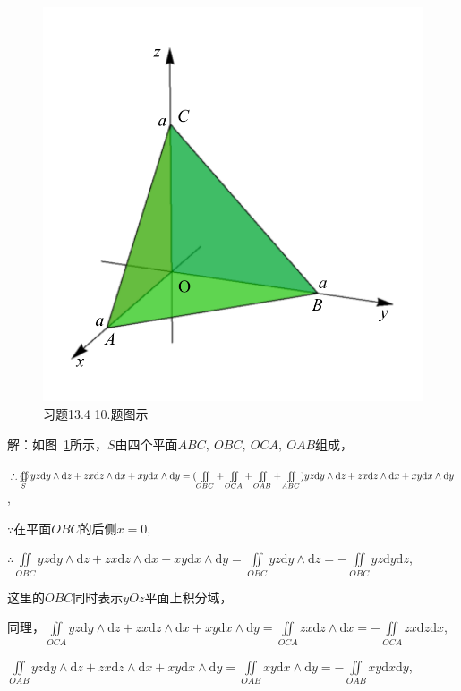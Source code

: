 \documentclass[12pt,UTF8,fleqn]{ctexart}
\newcommand{\md}[1]{\mathrm d#1}
\newcommand{\BSIInt}[2]{\iint\limits_{#1}#2}
\newcommand{\BSOIInt}[2]{\oiint\limits_{#1}#2}
\begin{document}
\begin{enumerate}
\begin{figure}[H]
\begin{center}
\includegraphics[height=0.7\textheight]{Figures23/Fig13-4-10.pdf}
\end{center}
\caption{习题13.4 10.题图示}
\label{13-4-10}
\end{figure}

解：如图~\ref{13-4-10}所示，$S$由四个平面$ABC,\ OBC,\ OCA,\ OAB$组成，

$\therefore\BSOIInt S{yz\md y\wedge\md z+zx\md z\wedge\md x+xy\md x\wedge\md y}\\
=(\BSIInt{OBC}+\BSIInt{OCA}+\BSIInt{OAB}+\BSIInt{ABC})yz\md y\wedge\md z+zx\md z\wedge\md x+xy\md x\wedge\md y$,

$\because$在平面$OBC$的后侧$x=0$,

$\therefore\BSIInt{OBC}yz\md y\wedge\md z+zx\md z\wedge\md x+xy\md x\wedge\md y=\BSIInt{OBC}yz\md y\wedge\md z=-\BSIInt{OBC}yz\md y\md z$,

这里的$OBC$同时表示$yOz$平面上积分域，

同理，$\BSIInt{OCA}yz\md y\wedge\md z+zx\md z\wedge\md x+xy\md x\wedge\md y=\BSIInt{OCA}zx\md z\wedge\md x=-\BSIInt{OCA}zx\md z\md x$,

$\BSIInt{OAB}yz\md y\wedge\md z+zx\md z\wedge\md x+xy\md x\wedge\md y=\BSIInt{OAB}xy\md x\wedge\md y=-\BSIInt{OAB}xy\md x\md y$,


\end{enumerate}
\end{document}

